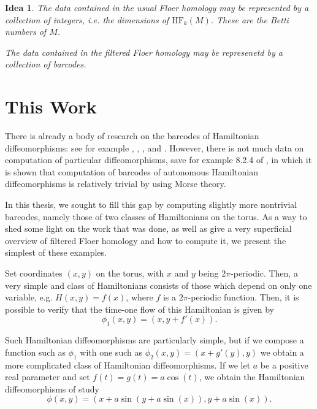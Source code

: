 \documentclass[11pt, a4paper]{article}
\newtheorem{idea}{Idea}
\theoremstyle{nonumberplain}
\newcommand{\HF}{\mathrm{HF}}
\begin{document}
\begin{idea}
The data contained in the usual Floer homology may be represented by a collection of integers, i.e. the dimensions of $\HF_k(M)$. These are the Betti numbers of $M$.

The data contained in the filtered Floer homology may be represenetd by a collection of barcodes.
\end{idea}

\section{This Work}

There is already a body of research on the barcodes of Hamiltonian diffeomorphisms: see for example \cite{polterovich}, \cite{kislev2022bounds}, \cite{roux2018barcodes}, and \cite{polterovich2016autonomous}. However, there is not much data on computation of particular diffeomorphisms, save for example 8.2.4 of \cite{polterovich}, in which it is shown that computation of barcodes of autonomous Hamiltonian diffeomorphisms is relatively trivial by using Morse theory.

In this thesis, we sought to fill this gap by computing slightly more nontrivial barcodes, namely those of two classes of Hamiltonians on the torus. As a way to shed some light on the work that was done, as well as give a very superficial overview of filtered Floer homology and how to compute it, we present the simplest of these examples.

Set coordinates $(x,y)$ on the torus, with $x$ and $y$ being $2\pi$-periodic. Then, a very simple and class of Hamiltonians consists of those which depend on only one variable, e.g. $H(x,y) = f(x)$, where $f$ is a $2\pi$-periodic function. Then, it is possible to verify that the time-one flow of this Hamiltonian is given by
\begin{equation}
\phi_1(x,y) = (x, y + f'(x)).
\end{equation}

Such Hamiltonian diffeomorphisms are particularly simple, but if we compose a function such as $\phi_1$ with one such as $\phi_2(x,y) = (x+g'(y), y)$ we obtain a more complicated class of Hamiltonian diffeomorphisms. If we let $a$ be a positive real parameter and set $f(t) = g(t) = a \cos(t)$, we obtain the Hamiltonian diffeomorphisms of study
\begin{equation}
\phi(x,y) = (x + a \sin(y + a \sin(x)), y + a \sin(x)).
\end{equation}
\end{document}
